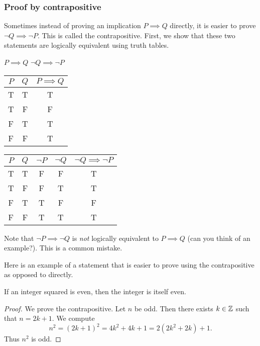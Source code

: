 \documentclass{article}
\begin{document}
\subsubsection{Proof by contrapositive}
Sometimes instead of proving an implication $P \implies Q$ directly, it is easier to prove $\neg Q \implies \neg P$. This is called the contrapositive. First, we show that these two statements are logically equivalent using truth tables. 

$P \implies Q$  \hspace{5cm}  $\neg Q \implies \neg P$

        \vspace{1em}
\begin{tabular}{|c|c| c|}
\hline
     $P$& $Q$ &  $P \implies Q$ \\ \hline
     T& T & T \\ \hline
     T & F & F \\ \hline
     F & T & T \\ \hline
     F & F & T \\ \hline
\end{tabular}   \hspace{2cm}  \begin{tabular}{|c | c | c |  c | c |}
\hline
     $P$& $Q$ & $\neg P$ &  $\neg Q$ & $\neg Q \implies \neg P$ \\ \hline
     T& T & F & F & T \\ \hline
     T & F & F &  T & T \\ \hline
     F & T &  T  & F & F \\ \hline
     F & F & T & T & T \\ \hline
\end{tabular}
\vspace{1.5em}

Note that $\neg P \implies \neg Q$ is \emph{not} logically equivalent to  $P \implies Q$ (can you think of an example?). This is a common mistake.

Here is an example of a statement that is easier to prove using the contrapositive as opposed to directly.

\begin{example}
If an integer squared is even, then the integer is itself even.
\end{example}

\begin{proof}
We prove the contrapositive. Let $n$ be odd. Then there exists $k \in {\mathbb{Z}}$ such that $n = 2k + 1$. We compute
$$n^2 = (2k + 1)^2 = 4k^2 + 4k + 1 = 2(2k^2+2k) + 1.$$
Thus $n^2$ is odd.
\end{proof}
\end{document}
